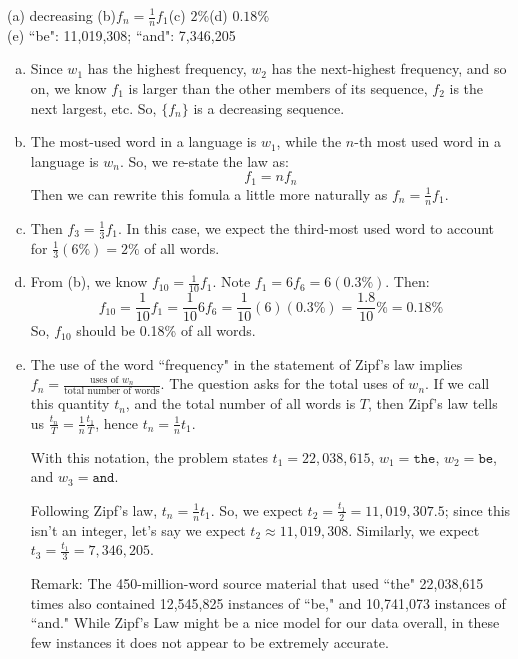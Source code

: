 \begin{answer}
	(a) decreasing \qquad(b)$f_n=\frac{1}{n}f_1$\qquad (c)  $2\%$\qquad(d) $0.18\%$\\
	(e) ``be":  11,019,308; ``and":  7,346,205%
\end{answer}
\begin{solution}
	\begin{enumerate}[(a)]
		\item Since $w_1$ has the highest frequency, $w_2$ has the next-highest frequency, and so on, we know $f_1$ is larger than the other members of its sequence, $f_2$ is the next largest, etc. So, $\{f_n\}$ is a decreasing sequence.
		\item The most-used word in a language is $w_1$, while the $n$-th most used word in a language is $w_n$. So, we re-state the law as:
		\[f_1=nf_n\] Then we can rewrite this fomula a little more naturally as $f_n=\frac{1}{n}f_1$.
		\item Then $f_3=\frac{1}{3}f_1$. In this case, we expect the third-most used word to account for  $\frac{1}{3}(6\%) = 2\%$ of all words.
		\item From (b), we know $f_{10}=\frac{1}{10}f_1$. Note $f_1=6f_6=6(0.3\%)$. Then:
		\[f_{10}=\frac{1}{10}f_1 = \frac{1}{10}6f_6=\frac{1}{10}(6)(0.3\%)=\frac{1.8}{10}\%=0.18\%\]
		So, $f_{10}$ should be 0.18\% of all words.
		\item The use of the word ``frequency" in the statement of Zipf's law implies $f_n = \frac{\text{uses of $w_n$}}{\text{total number of words}}$. The question asks for the total uses of $w_n$. If we call this quantity $t_n$, and the total number of all words is $T$, then Zipf's law tells us $\frac{t_n}{T}=\frac{1}{n}\frac{t_1}{T}$, hence $t_n=\frac{1}{n}t_1$.

		With this notation, the problem states $t_1=22,038,615$, $w_1=\texttt{the}$, $w_2=\texttt{be}$, and  $w_3=\texttt{and}$.

		Following Zipf's law, $t_n=\frac1nt_1$. So, we expect $t_2=\frac{t_1}{2} = 11,019,307.5$; since this isn't an integer, let's say we expect $t_2\approx 11,019,308$. Similarly, we expect
		$t_3=\frac{t_1}{3} = 7,346,205$.

		Remark: The 450-million-word source material that used ``the" 22,038,615 times also contained 12,545,825 instances of ``be," and 10,741,073 instances of ``and." While Zipf's Law might be a nice model for our data overall, in these few instances it does not appear to be extremely accurate.


\end{enumerate}
\end{solution}
